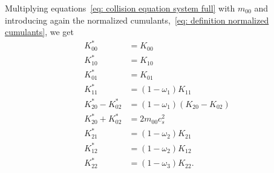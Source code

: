 Multiplying equations~\eqref{eq: collision equation system full} with $m_{00}$ and introducing again the normalized cumulants,~\eqref{eq: definition normalized cumulants}, we get
\begin{equation}
  \label{eq: final collision all relaxations}
  \begin{aligned}
    K_{00}^{*} & = K_{00} \\
    K_{10}^{*} & = K_{10} \\
    K_{01}^{*} & = K_{01} \\
    K_{11}^{*} & = (1-\omega_1)K_{11} \\
    K_{20}^{*} - K_{02}^{*} & = (1-\omega_1) (K_{20} - K_{02}) \\
    K_{20}^{*} + K_{02}^{*} & = 2 m_{00} c_s^2 \\
    K_{21}^{*} & = (1-\omega_2)K_{21} \\
    K_{12}^{*} & = (1-\omega_2)K_{12} \\
    K_{22}^{*} & = (1-\omega_3)K_{22}.
  \end{aligned}
\end{equation}
